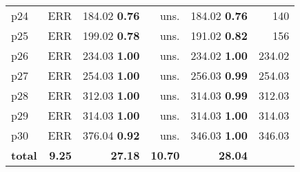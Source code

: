 \begin{tabular}{lrrrrr}
\multicolumn{1}{l|}{p24} & ERR & {\footnotesize 184.02} \textbf{0.76} & uns. & {\footnotesize 184.02} \textbf{0.76} & \multicolumn{1}{|r}{140}\\
\multicolumn{1}{l|}{p25} & ERR & {\footnotesize 199.02} \textbf{0.78} & uns. & {\footnotesize 191.02} \textbf{0.82} & \multicolumn{1}{|r}{156}\\
\multicolumn{1}{l|}{p26} & ERR & {\footnotesize 234.03} \textbf{1.00} & uns. & {\footnotesize 234.02} \textbf{1.00} & \multicolumn{1}{|r}{234.02}\\
\multicolumn{1}{l|}{p27} & ERR & {\footnotesize 254.03} \textbf{1.00} & uns. & {\footnotesize 256.03} \textbf{0.99} & \multicolumn{1}{|r}{254.03}\\
\multicolumn{1}{l|}{p28} & ERR & {\footnotesize 312.03} \textbf{1.00} & uns. & {\footnotesize 314.03} \textbf{0.99} & \multicolumn{1}{|r}{312.03}\\
\multicolumn{1}{l|}{p29} & ERR & {\footnotesize 314.03} \textbf{1.00} & uns. & {\footnotesize 314.03} \textbf{1.00} & \multicolumn{1}{|r}{314.03}\\
\multicolumn{1}{l|}{p30} & ERR & {\footnotesize 376.04} \textbf{0.92} & uns. & {\footnotesize 346.03} \textbf{1.00} & \multicolumn{1}{|r}{346.03}\\
\midrule
\textbf{total} & \textbf{9.25} & \textbf{27.18} & \textbf{10.70} & \textbf{28.04} & \\
\bottomrule
\end{tabular}

